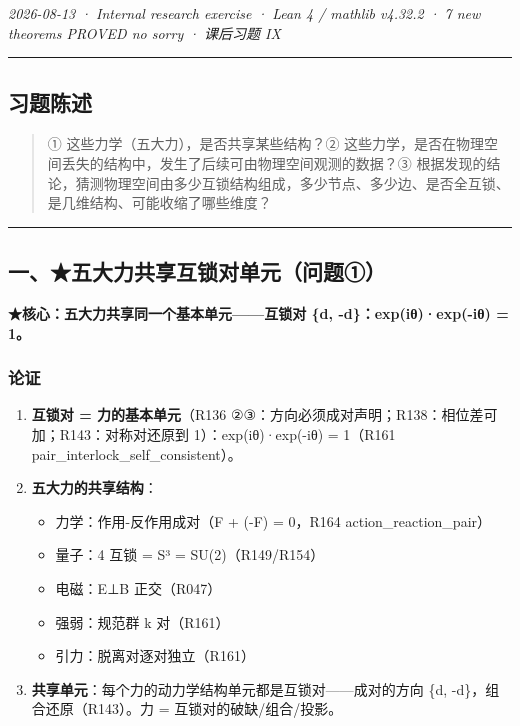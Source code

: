 \documentclass[
]{article}
\providecommand{\tightlist}{%
 \setlength{\itemsep}{0pt}\setlength{\parskip}{0pt}}
\begin{document}
\emph{2026-08-13 · Internal research exercise · Lean 4 / mathlib v4.32.2
· 7 new theorems PROVED no sorry · 课后习题 IX }

\begin{center}\rule{0.5\linewidth}{0.5pt}\end{center}

\subsection{习题陈述}\label{ux4e60ux9898ux9648ux8ff0}

\begin{quote}
① 这些力学（五大力），是否共享某些结构？②
这些力学，是否在物理空间丢失的结构中，发生了后续可由物理空间观测的数据？③
根据发现的结论，猜测物理空间由多少互锁结构组成，多少节点、多少边、是否全互锁、是几维结构、可能收缩了哪些维度？
\end{quote}

\begin{center}\rule{0.5\linewidth}{0.5pt}\end{center}

\subsection{一、★五大力共享互锁对单元（问题①）}\label{ux4e00ux4e94ux5927ux529bux5171ux4eabux4e92ux9501ux5bf9ux5355ux5143ux95eeux9898ux2460}

\textbf{★核心：五大力共享同一个基本单元------互锁对 \{d,
-d\}：exp(iθ)·exp(-iθ) = 1。}

\subsubsection{论证}\label{ux8bbaux8bc1}

\begin{enumerate}
\def\labelenumi{\arabic{enumi}.}
\tightlist
\item
 \textbf{互锁对 = 力的基本单元}（R136
 ②③：方向必须成对声明；R138：相位差可加；R143：对称对还原到
 1）：exp(iθ)·exp(-iθ) = 1（R161 pair\_interlock\_self\_consistent）。
\item
 \textbf{五大力的共享结构}：

 \begin{itemize}
 \tightlist
 \item
 力学：作用-反作用成对（F + (-F) = 0，R164 action\_reaction\_pair）
 \item
 量子：4 互锁 = S³ = SU(2)（R149/R154）
 \item
 电磁：E⊥B 正交（R047）
 \item
 强弱：规范群 k 对（R161）
 \item
 引力：脱离对逐对独立（R161）
 \end{itemize}
\item
 \textbf{共享单元}：每个力的动力学结构单元都是互锁对------成对的方向
 \{d, -d\}，组合还原（R143）。力 = 互锁对的破缺/组合/投影。
\end{enumerate}
\end{document}
